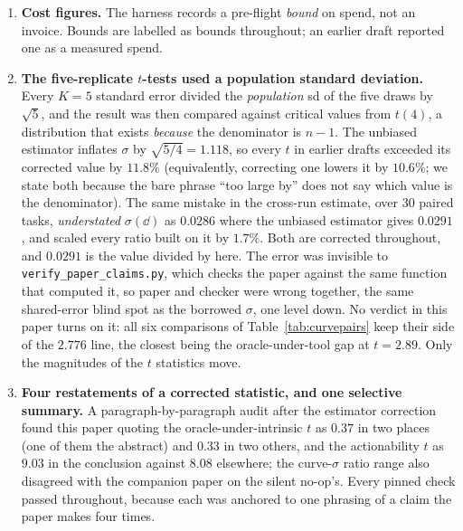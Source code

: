\documentclass[11pt]{article}
\begin{document}
\begin{enumerate}
{    independent seeds.} That benchmark shuffles a fixed vendored pool, so a seed selects a
    partition rather than drawing a fresh sample; at six seeds of ten the measured held-out
    overlap is $6.7\%$. The affected effect is reported without an interval
    (\S\ref{sec:bcb}).
  \item \textbf{Cost figures.} The harness records a pre-flight \emph{bound} on spend, not an
    invoice. Bounds are labelled as bounds throughout; an earlier draft
    reported one as a measured spend.
  \item \textbf{The five-replicate $t$-tests used a population standard deviation.} Every
    $K{=}5$ standard error divided the \emph{population} sd of the five draws by $\sqrt{5}$, and
    the result was then compared against critical values from $t(4)$, a distribution that
    exists \emph{because} the denominator is $n-1$. The unbiased estimator inflates $\sigma$ by
    $\sqrt{5/4} = 1.118$, so every $t$ in earlier drafts exceeded its corrected value by
    $11.8\%$ (equivalently, correcting one lowers it by $10.6\%$; we state both because the
    bare phrase ``too large by'' does not say which value is the denominator). The same
    mistake in the cross-run estimate, over $30$ paired tasks, \emph{understated} $\sigma(\dd)$
    as $0.0286$ where the unbiased estimator gives $0.0291$, and scaled every ratio built on it
    by $1.7\%$. Both are corrected throughout, and $0.0291$ is the value divided by here. The
    error was invisible to \texttt{verify\_paper\_claims.py}, which checks the paper against the
    same function that computed it, so paper and checker were wrong together, the same
    shared-error blind spot as the borrowed $\sigma$, one level down.
    No verdict in this paper turns on it: all six comparisons of
    Table~\ref{tab:curvepairs} keep their side of the $2.776$ line, the closest being the
    oracle-under-tool gap at $t = 2.89$. Only the magnitudes of the $t$ statistics move.
  \item \textbf{Four restatements of a corrected statistic, and one selective summary.} A
    paragraph-by-paragraph audit after the estimator correction found this paper quoting the
    oracle-under-intrinsic $t$ as $0.37$ in two places (one of them the abstract) and $0.33$ in two
    others, and the actionability $t$ as $9.03$ in the conclusion against $8.08$ elsewhere; the
    curve-$\sigma$ ratio range also disagreed with the companion paper on the silent no-op's. Every pinned check passed
    throughout, because each was anchored to one phrasing of a claim the paper makes four times.

\end{enumerate}
\end{document}
